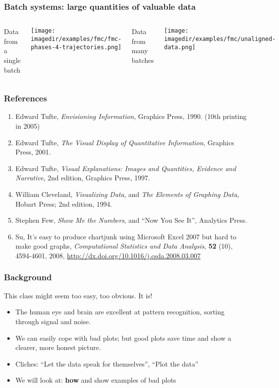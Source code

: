 \begin{frame}\frametitle{Batch systems: large quantities of valuable data}
	\begin{columns}[t]
			Data from a single batch
			\begin{center}
				\texttt{[image: \\imagedir/examples/fmc/fmc-phases-4-trajectories.png]}
			\end{center}
			Data from many batches
			\begin{center}
				\texttt{[image: \\imagedir/examples/fmc/unaligned-data.png]}
			\end{center}
	\end{columns}
\end{frame}

\begin{frame}\frametitle{References}
	\begin{enumerate}
		\item	Edward Tufte, \emph{Envisioning Information}, Graphics Press, 1990. (10th printing in 2005) 
		\item	Edward Tufte, \emph{The Visual Display of Quantitative Information}, Graphics Press, 2001. 
		\item	Edward Tufte, \emph{Visual Explanations: Images and Quantities, Evidence and Narrative}, 2nd edition, Graphics Press, 1997. 
		\item	William Cleveland, \emph{Visualizing Data}, and \emph{The Elements of Graphing Data}, Hobart Press; 2nd edition, 1994. 
		\item	Stephen Few, \emph{Show Me the Numbers}, and ``Now You See It'', Analytics Press. 
		\item	Su, It's easy to produce chartjunk using Microsoft Excel 2007 but hard to make good graphs, \emph{Computational Statistics and Data Analysis}, \textbf{52} (10), 4594-4601, 2008, \href{http://dx.doi.org/10.1016/j.csda.2008.03.007}{http://dx.doi.org/10.1016/j.csda.2008.03.007} 
	\end{enumerate}
\end{frame}

\begin{frame}\frametitle{Background}
	
	This class might seem too easy, too obvious. It is!
	\begin{itemize}
		\item	The human eye and brain are excellent at pattern recognition, sorting through signal and noise. \pause 
		\item	We can easily cope with bad plots; but good plots save time and show a clearer, more honest picture. 
		\item	Cliches: ``Let the data speak for themselves'', ``Plot the data'' 
		\item	We will look at: \textbf{how} and show examples of bad plots
	\end{itemize}
\end{frame}

